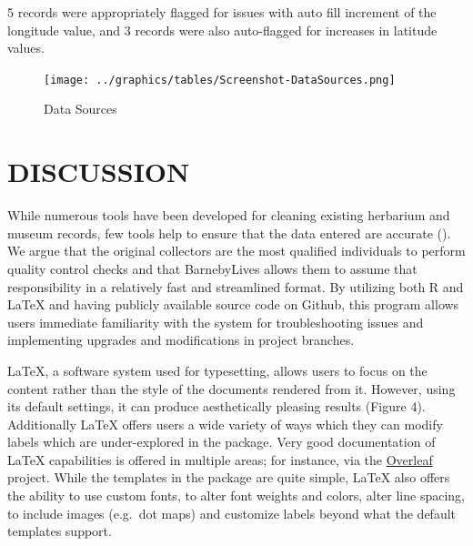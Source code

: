 \documentclass[
]{article}
\begin{document}
5 records were appropriately flagged for issues with auto fill increment
of the longitude value, and 3 records were also auto-flagged for
increases in latitude values.

\begin{figure}
\centering
\texttt{[image: ../graphics/tables/Screenshot-DataSources.png]}
\caption{Data Sources}
\end{figure}

\section{DISCUSSION}\label{discussion}

While numerous tools have been developed for cleaning existing herbarium
and museum records, few tools help to ensure that the data entered are
accurate (). We
argue that the original collectors are the most qualified individuals to
perform quality control checks and that BarnebyLives allows them to
assume that responsibility in a relatively fast and streamlined format.
By utilizing both R and LaTeX and having publicly available source code
on Github, this program allows users immediate familiarity with the
system for troubleshooting issues and implementing upgrades and
modifications in project branches.

LaTeX, a software system used for typesetting, allows users to focus on
the content rather than the style of the documents rendered from it.
However, using its default settings, it can produce aesthetically
pleasing results (Figure 4). Additionally LaTeX offers users a wide
variety of ways which they can modify labels which are under-explored in
the package. Very good documentation of LaTeX capabilities is offered in
multiple areas; for instance, via the
\href{https://www.overleaf.com/learn}{Overleaf} project. While the
templates in the package are quite simple, LaTeX also offers the ability
to use custom fonts, to alter font weights and colors, alter line
spacing, to include images (e.g.~dot maps) and customize labels beyond
what the default templates support.
\end{document}
